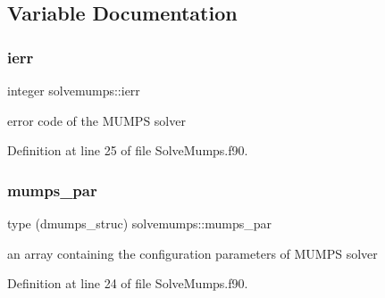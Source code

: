 \subsection{Variable Documentation}
\mbox{\label{namespacesolvemumps_a5f812a31bb5931d66e5d6bb4c05f4a51}} 
\subsubsection{\texorpdfstring{ierr}{ierr}}
{\footnotesize\ttfamily integer solvemumps\+::ierr}



error code of the M\+U\+M\+PS solver 



Definition at line 25 of file Solve\+Mumps.\+f90.

\mbox{\label{namespacesolvemumps_ab76b5a7f705b0acb09ebc3ecf7e51f91}} 
\subsubsection{\texorpdfstring{mumps\+\_\+par}{mumps\_par}}
{\footnotesize\ttfamily type (dmumps\+\_\+struc) solvemumps\+::mumps\+\_\+par}



an array containing the configuration parameters of M\+U\+M\+PS solver 



Definition at line 24 of file Solve\+Mumps.\+f90.

